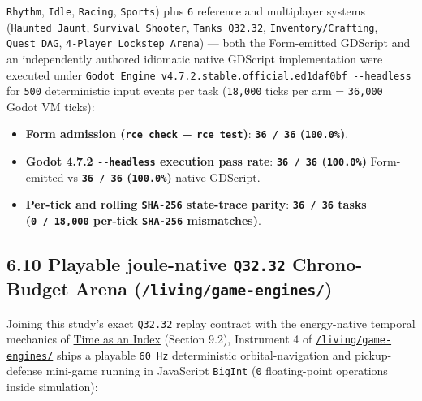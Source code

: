 \documentclass[10pt,letterpaper]{article}
\providecommand{\tightlist}{\setlength{\itemsep}{1pt}\setlength{\parskip}{0pt}}
\begin{document}
\begin{itemize}
  \texttt{Rhythm}, \texttt{Idle}, \texttt{Racing}, \texttt{Sports}) plus
  \texttt{6} reference and multiplayer systems (\texttt{Haunted\ Jaunt},
  \texttt{Survival\ Shooter}, \texttt{Tanks\ Q32.\allowbreak{}32},
  \texttt{Inventory/\allowbreak{}Crafting}, \texttt{Quest\ DAG},
  \texttt{4-\allowbreak{}Player\ Lockstep\ Arena}) --- both the Form-emitted GDScript
  and an independently authored idiomatic native GDScript implementation
  were executed under
  \texttt{Godot\ Engine\ v4.\allowbreak{}7.\allowbreak{}2.\allowbreak{}stable.\allowbreak{}official.\allowbreak{}ed1daf0bf\ -\allowbreak{}\/\allowbreak{}-\allowbreak{}headless}
  for \texttt{500} deterministic input events per task (\texttt{18,000}
  ticks per arm = \texttt{36,000} Godot VM ticks):

  \begin{itemize}
  \tightlist
  \item
    \textbf{Form admission (\texttt{rce\ check} + \texttt{rce\ test})}:
    \textbf{\texttt{36\ /\ 36} (\texttt{100.0\%})}.
  \item
    \textbf{Godot 4.7.2 \texttt{-\allowbreak{}\/\allowbreak{}-\allowbreak{}headless} execution pass rate}:
    \textbf{\texttt{36\ /\ 36} (\texttt{100.0\%})} Form-emitted vs
    \textbf{\texttt{36\ /\ 36} (\texttt{100.0\%})} native GDScript.
  \item
    \textbf{Per-tick and rolling \texttt{SHA-256} state-trace parity}:
    \textbf{\texttt{36\ /\ 36} tasks (\texttt{0\ /\allowbreak{}\ 18,\allowbreak{}000} per-tick
    \texttt{SHA-256} mismatches)}.
  \end{itemize}
\end{itemize}

\subsection{\texorpdfstring{6.10 Playable joule-native \texttt{Q32.32}
Chrono-Budget Arena
(\texttt{/\allowbreak{}living/\allowbreak{}game-\allowbreak{}engines/\allowbreak{}})}{6.10 Playable joule-native Q32.32 Chrono-Budget Arena (/living/game-engines/)}}\label{playable-joule-native-q32.32-chrono-budget-arena-livinggame-engines}

Joining this study's exact \texttt{Q32.32} replay contract with the
energy-native temporal mechanics of
\href{https://research.openie.dev/papers/time-as-an-index/}{Time as an
Index} (Section 9.2), Instrument 4 of
\href{https://research.openie.dev/living/game-engines/}{\texttt{/\allowbreak{}living/\allowbreak{}game-\allowbreak{}engines/\allowbreak{}}}
ships a playable \texttt{60\ Hz} deterministic orbital-navigation and
pickup-defense mini-game running in JavaScript \texttt{BigInt}
(\texttt{0} floating-point operations inside simulation):
\end{document}
